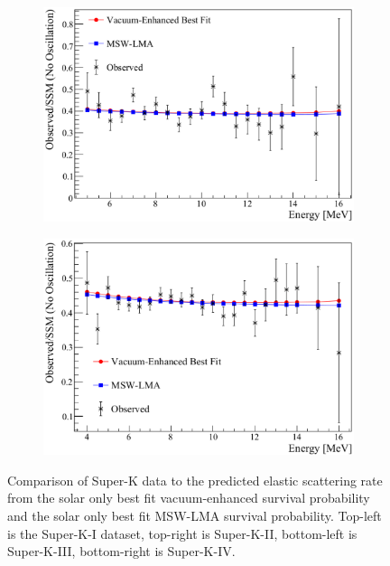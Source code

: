 \begin{figure}[htbp]
\begin{subfigure}[b]{0.48\textwidth}
    \centering
    \includegraphics[width=\textwidth]{superk3_bf_solar_only}
    \caption[]{}
  \end{subfigure}
  \hfill
\begin{subfigure}[b]{0.48\textwidth}
    \centering
    \includegraphics[width=\textwidth]{superk4_bf_solar_only}
    \caption[]{}
  \end{subfigure}
  \caption[Super-K Fit Comparison for Solar Only Best Fit Vacuum-Enhanced Mixing and MSW-LMA Mixing]{
  Comparison of Super-K data to the predicted elastic scattering rate from the
  solar only best fit vacuum-enhanced survival probability
and the solar only best fit MSW-LMA survival probability.
Top-left is the Super-K-I dataset, top-right is Super-K-II, bottom-left is Super-K-III,
bottom-right is Super-K-IV.}
  \label{fig:solar_only_sk}
\end{figure}

